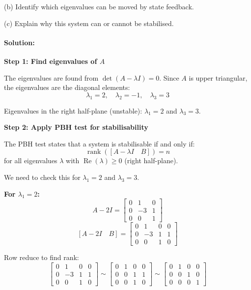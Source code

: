 \documentclass[11pt,a4paper]{article}
\begin{document}
(b) Identify which eigenvalues can be moved by state feedback.

(c) Explain why this system can or cannot be stabilised.

\paragraph{Solution:}

\textbf{Step 1: Find eigenvalues of $A$}

The eigenvalues are found from $\det(A - \lambda I) = 0$. Since $A$ is upper triangular, the eigenvalues are the diagonal elements:
\[
\lambda_1 = 2, \quad \lambda_2 = -1, \quad \lambda_3 = 3
\]

Eigenvalues in the right half-plane (unstable): $\lambda_1 = 2$ and $\lambda_3 = 3$.

\textbf{Step 2: Apply PBH test for stabilisability}

The PBH test states that a system is stabilisable if and only if:
\[
\operatorname{rank}([A - \lambda I \quad B]) = n
\]
for all eigenvalues $\lambda$ with $\operatorname{Re}(\lambda) \geq 0$ (right half-plane).

We need to check this for $\lambda_1 = 2$ and $\lambda_3 = 3$.

\textbf{For $\lambda_1 = 2$:}
\[
A - 2I = \begin{bmatrix} 0 & 1 & 0 \\ 0 & -3 & 1 \\ 0 & 0 & 1 \end{bmatrix}
\]
\[
[A - 2I \quad B] = \begin{bmatrix} 0 & 1 & 0 & 0 \\ 0 & -3 & 1 & 1 \\ 0 & 0 & 1 & 0 \end{bmatrix}
\]

Row reduce to find rank:
\[
\begin{bmatrix} 0 & 1 & 0 & 0 \\ 0 & -3 & 1 & 1 \\ 0 & 0 & 1 & 0 \end{bmatrix} \sim \begin{bmatrix} 0 & 1 & 0 & 0 \\ 0 & 0 & 1 & 1 \\ 0 & 0 & 1 & 0 \end{bmatrix} \sim \begin{bmatrix} 0 & 1 & 0 & 0 \\ 0 & 0 & 1 & 0 \\ 0 & 0 & 0 & 1 \end{bmatrix}
\]
\end{document}
